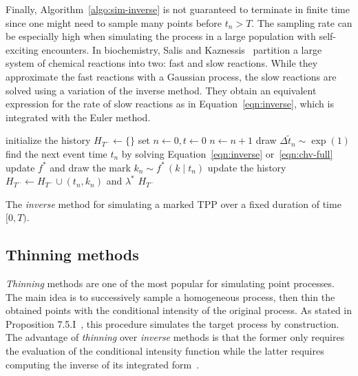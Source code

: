 \documentclass{juliacon}
\numberwithin{equation}{section}
\begin{document}
Finally, Algorithm~\ref{algo:sim-inverse} is not guaranteed to terminate in finite time since one might need to sample many points before \( t_n > T \). The sampling rate can be especially high when simulating the process in a large population with self-exciting encounters. In biochemistry, Salis and Kaznessis~\cite{salis2005} partition a large system of chemical reactions into two: fast and slow reactions. While they approximate the fast reactions with a Gaussian process, the slow reactions are solved using a variation of the inverse method. They obtain an equivalent expression for the rate of slow reactions as in Equation~\ref{eqn:inverse}, which is integrated with the Euler method.

\begin{algorithm}[h]
\begin{algorithmic}[1]
  \Procedure{InverseMethod}{\( [0, T) \), \( \lambda^\ast \), \( f^\ast \),}
    \State initialize the history \( H_{T^-} \leftarrow \{ \} \)
    \State set \( n \leftarrow 0, t \leftarrow  0 \)
      \State \( n \leftarrow n + 1 \)
      \State draw \( \Delta \tilde{t}_n \sim \exp(1) \)
      \State find the next event time \( t_n \) by solving Equation~\ref{eqn:inverse} or~\ref{eqn:chv-full}
      \State update \( f^\ast \) and draw the mark \( k_n \sim f^\ast \, (k \mid t_n) \) \label{line:inverse-mark-sample}
      \State update the history \( H_{T^-} \leftarrow H_{T^-} \cup (t_n, k_n) \) and \( \lambda^\ast \) \label{line:inverse-history-update}
    \EndWhile
    \State \Return \( H_{T^-} \)
  \EndProcedure
\end{algorithmic}
\caption{The \textit{inverse} method for simulating a marked TPP over a fixed duration of time \( [0, T) \).}
\label{algo:sim-inverse}
\end{algorithm}

\subsection{Thinning methods} \label{subsec:sim-thinning}

\textit{Thinning} methods are one of the most popular for simulating point processes. The main idea is to successively sample a homogeneous process, then thin the obtained points with the conditional intensity of the original process. As stated in Proposition 7.5.I~\cite{daley2003}, this procedure simulates the target process by construction. The advantage of \textit{thinning} over \textit{inverse} methods is that the former only requires the evaluation of the conditional intensity function while the latter requires computing the inverse of its integrated form~\cite{daley2003}.
\end{document}
